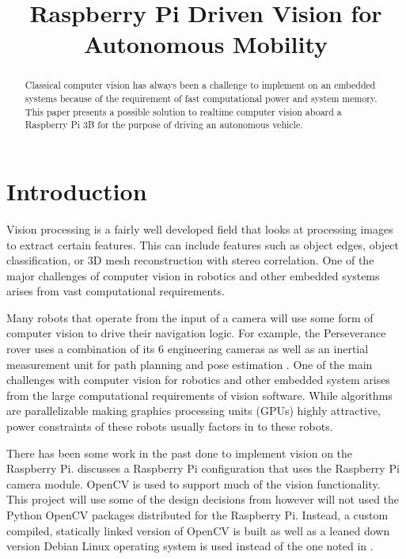 \documentclass{article}
\title{Raspberry Pi Driven Vision for Autonomous Mobility}
\begin{document}
\maketitle

\begin{abstract}
Classical computer vision has always been a challenge to implement on an embedded
systems because of the requirement of fast computational power and system memory.
This paper presents a possible solution to realtime computer vision aboard a
Raspberry Pi 3B for the purpose of driving an autonomous vehicle.
\end{abstract}

\section{Introduction}

Vision processing is a fairly well developed field that looks at processing images
to extract certain features. This can include features such as object edges, object
classification, or 3D mesh reconstruction with stereo correlation. One of the major
challenges of computer vision in robotics and other embedded systems arises from
vast computational requirements.

Many robots that operate from the input of a camera will use some form of computer
vision to drive their navigation logic. For example, the Perseverance rover uses
a combination of its 6 engineering cameras as well as an inertial measurement unit
for path planning and pose estimation \cite{b1}. One of the main challenges with
computer vision for robotics and other embedded system arises from the large computational
requirements of vision software. While algorithms are parallelizable making
graphics processing units (GPUs) highly attractive, power constraints of these robots
usually factors in to these robots.

There has been some work in the past done to implement vision on the Raspberry Pi. \cite{b3}
discusses a Raspberry Pi configuration that uses the Raspberry Pi camera module. OpenCV
is used to support much of the vision functionality. This project will use some of the
design decisions from \cite{b3} however will not used the Python OpenCV packages distributed
for the Raspberry Pi. Instead, a custom compiled, statically linked version of OpenCV is
built as well as a leaned down version Debian Linux operating system is used instead of
the one noted in \cite{b3}.
\end{document}
